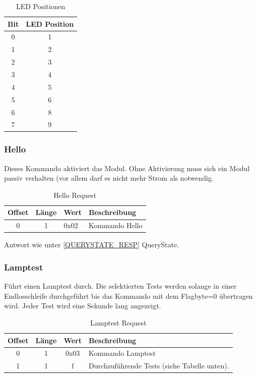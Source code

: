 \documentclass[10pt,a4paper]{article}
\begin{document}
\begin{table}[H]
\centering
\begin{tabular}{c|c}
\label{POSMASK}
\textbf{Bit} & \textbf{LED Position} \\ \hline
0 & 1 \\
1 & 2 \\
2 & 3 \\
3 & 4 \\
4 & 5 \\
5 & 6 \\
6 & 8 \\
7 & 9
\end{tabular}
\caption{LED Positionen}
\end{table}


\subsubsection{Hello}
\label{sec:Hello}
Dieses Kommando aktiviert das Modul. Ohne Aktivierung muss sich ein Modul passiv verhalten (vor allem darf es nicht mehr Strom als notwendig.
\begin{table}[H]
\centering
\begin{tabular}{c|c|l|l}
\textbf{Offset} & \textbf{Länge} & \textbf{Wert} & \textbf{Beschreibung} \\ \hline
0 & 1 & 0x02 & Kommando Hello 
\end{tabular}
\caption{Hello Request}
\end{table}
Antwort wie unter \ref{QUERYSTATE_RESP} QueryState.

\subsubsection{Lamptest}
\label{sec:Lamptest}
Führt einen Lamptest durch. Die selektierten Tests werden solange in einer Endlosschleife durchgeführt bis das Kommando mit dem Flagbyte=0 übertragen wird. Jeder Test wird eine Sekunde lang angezeigt.
\begin{table}[H]
\centering
\begin{tabular}{c|c|c|l}
\textbf{Offset} & \textbf{Länge} & \textbf{Wert} & \textbf{Beschreibung} \\ \hline
0 & 1 & 0x03 & Kommando Lamptest\\
1 & 1 & f & Durchzuführende Tests (siehe Tabelle unten). 
\end{tabular}
\caption{Lamptest Request}
\end{table}
\end{document}
